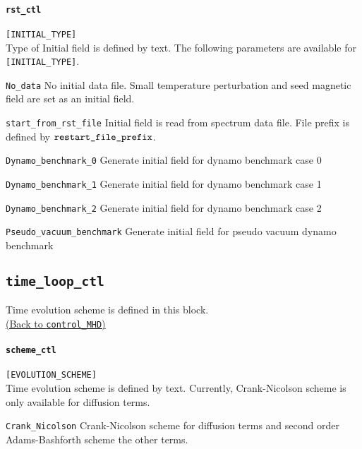 \paragraph{\tt rst\_ctl}
\label{href_t:rst_ctl}
\verb|[INITIAL_TYPE]| \\
Type of Initial field is defined by text. The following parameters are available for \verb|[INITIAL_TYPE]|.
%
\begin{description}
\item{\tt No\_data}  No initial data file. Small temperature perturbation and seed magnetic field are set as an initial field.
\item{\tt start\_from\_rst\_file} Initial field is read from spectrum data file. File prefix is defined by \hyperref[href_t:restart_file_prefix]{$\mbox{\tt restart\_file\_prefix}$}.
\item{\tt Dynamo\_benchmark\_0}   Generate initial field for dynamo benchmark case 0
\item{\tt Dynamo\_benchmark\_1}   Generate initial field for dynamo benchmark case 1
\item{\tt Dynamo\_benchmark\_2}   Generate initial field for dynamo benchmark case 2
\item{\tt Pseudo\_vacuum\_benchmark} Generate initial field for pseudo vacuum dynamo benchmark
\end{description}
%

\subsection{\tt time\_loop\_ctl}
\label{href_t:time_loop_ctl}
Time evolution scheme is defined in this block. \\
\hyperref[href_i:time_loop_ctl]{(Back to {\tt control\_MHD})}

\paragraph{\tt scheme\_ctl}
\label{href_t:scheme_ctl}
\verb|[EVOLUTION_SCHEME]| \\
Time evolution scheme is defined by text. Currently, Crank-Nicolson scheme is only available for diffusion terms.
%
\begin{description}
\item{\tt Crank\_Nicolson} Crank-Nicolson scheme for diffusion terms and second order Adams-Bashforth scheme the other terms.
\end{description}
%

